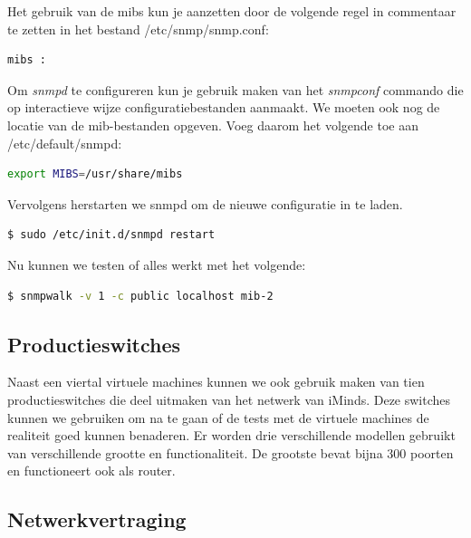 Het gebruik van de \glspl{mib} kun je aanzetten door de volgende regel in commentaar te zetten in het bestand /etc/snmp/snmp.conf:

\begin{lstlisting}[language=bash]
mibs :
\end{lstlisting}

Om \textit{snmpd} te configureren kun je gebruik maken van het \textit{snmpconf} commando die op interactieve wijze configuratiebestanden aanmaakt.
We moeten ook nog de locatie van de \gls{mib}-bestanden opgeven. Voeg daarom het volgende toe aan /etc/default/snmpd:

\begin{lstlisting}[language=bash]
export MIBS=/usr/share/mibs
\end{lstlisting}

Vervolgens herstarten we snmpd om de nieuwe configuratie in te laden.

\begin{lstlisting}[language=bash]
$ sudo /etc/init.d/snmpd restart
\end{lstlisting}

Nu kunnen we testen of alles werkt met het volgende:

\begin{lstlisting}[language=bash]
$ snmpwalk -v 1 -c public localhost mib-2
\end{lstlisting}




\subsection{Productieswitches}


Naast een viertal virtuele machines kunnen we ook gebruik maken van tien productieswitches die deel uitmaken van het netwerk van iMinds.
Deze switches kunnen we gebruiken om na te gaan of de tests met de virtuele machines de realiteit goed kunnen benaderen.
Er worden drie verschillende modellen gebruikt van verschillende grootte en functionaliteit.
De grootste bevat bijna 300 poorten en functioneert ook als router.

\subsection{Netwerkvertraging}
\label{latency}

